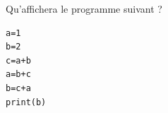 \begin{exo}{}
	Qu'affichera le programme suivant ?

	\begin{lstlisting}
a=1
b=2
c=a+b
a=b+c
b=c+a
print(b)
\end{lstlisting}
\end{exo}
